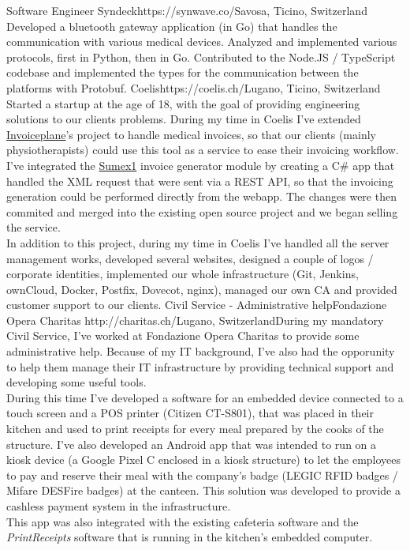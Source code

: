 \begin{CV}
        {Software Engineer}
        {Syndeck}{https://synwave.co/}{Savosa, Ticino, Switzerland}
        {Developed a bluetooth gateway application (in Go) that handles the communication with various
        medical devices. Analyzed and implemented various protocols, first in Python, then in Go.
        Contributed to the Node.JS / TypeScript codebase and implemented the types for the communication 
        between the platforms with Protobuf.}
        {Coelis}{https://coelis.ch/}{Lugano, Ticino, Switzerland}
        {Started a startup at the age of 18, with the goal of providing engineering solutions to our clients problems.
        During my time in Coelis I've extended \href{https://github.com/invoiceplane}{Invoiceplane}'s project to handle
        medical invoices, so that our clients (mainly physiotherapists) could use this tool as a service to ease their 
        invoicing workflow. 
        I've integrated the \href{http://sumex1.net/}{Sumex1} invoice generator module by creating 
        a C\# app that handled the XML request that were sent via a REST API, so that the invoicing generation could be 
        performed directly from the webapp. The changes were then commited and merged into the existing open source 
        project and we began selling the service. \\
        In addition to this project, during my time in Coelis I've handled all the server management works,
        developed several websites, designed a couple of logos / corporate identities, implemented our whole
        infrastructure (Git, Jenkins, ownCloud, Docker, Postfix, Dovecot, nginx), managed our own CA and provided 
        customer support to our clients.}
    {Civil Service - Administrative help}{Fondazione Opera Charitas}
    {http://charitas.ch/}{Lugano, Switzerland}{During my mandatory Civil Service, I've worked at Fondazione Opera 
        Charitas to provide some administrative help.
        Because of my IT background, I've also had the opporunity to help them manage their IT infrastructure 
        by providing technical support and developing some useful tools.\\
        During this time I've developed a software for an embedded device connected to a touch screen and a 
        POS printer (Citizen CT-S801), that was placed in their kitchen and used to
        print receipts for every meal prepared by the cooks of the structure.
        I've also developed an Android app that was intended to run on a kiosk device 
        (a Google Pixel C enclosed in a kiosk structure) to let the employees to pay and reserve their meal
        with the company's badge (LEGIC RFID badges / Mifare DESFire badges) at the canteen. This solution was
        developed to provide a cashless payment system in the infrastructure. \\
        This app was also integrated with the existing cafeteria software and the 
        \textit{PrintReceipts} software that is running in the kitchen's embedded computer.}
\end{CV}